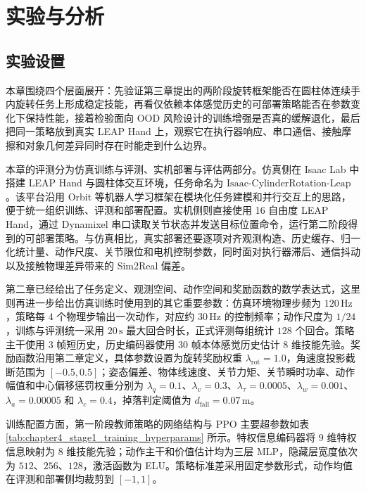 \section{实验与分析}

\subsection{实验设置}
\label{sec:chapter4_exp_setting}
\thesisbodyfont
本章围绕四个层面展开：先验证第三章提出的两阶段旋转框架能否在圆柱体连续手内旋转任务上形成稳定技能，再看仅依赖本体感觉历史的可部署策略能否在参数变化下保持性能，接着检验面向 OOD 风险设计的训练增强是否真的缓解退化，最后把同一策略放到真实 LEAP Hand 上，观察它在执行器响应、串口通信、接触摩擦和对象几何差异同时存在时能走到什么边界。

本章的评测分为仿真训练与评测、实机部署与评估两部分。仿真侧在 Isaac Lab 中搭建 LEAP Hand 与圆柱体交互环境，任务命名为 \(\mathrm{Isaac\text{-}CylinderRotation\text{-}Leap}\)。该平台沿用 Orbit 等机器人学习框架在模块化任务建模和并行交互上的思路，便于统一组织训练、评测和部署配置\cite{orbit2023}。实机侧则直接使用 16 自由度 LEAP Hand，通过 Dynamixel 串口读取关节状态并发送目标位置命令，运行第二阶段得到的可部署策略。与仿真相比，真实部署还要逐项对齐观测构造、历史缓存、归一化统计量、动作尺度、关节限位和电机控制参数，同时面对执行器滞后、通信抖动以及接触物理差异带来的 Sim2Real 偏差。

第二章已经给出了任务定义、观测空间、动作空间和奖励函数的数学表达式，这里则再进一步给出仿真训练时使用到的其它重要参数：仿真环境物理步频为 \(120\,\mathrm{Hz}\)，策略每 \(4\) 个物理步输出一次动作，对应约 \(30\,\mathrm{Hz}\) 的控制频率；动作尺度为 \(1/24\)，训练与评测统一采用 \(20\,\mathrm{s}\) 最大回合时长，正式评测每组统计 \(128\) 个回合。策略主干使用 \(3\) 帧短历史，历史编码器使用 \(30\) 帧本体感觉历史估计 \(8\) 维技能先验。奖励函数沿用第二章定义，具体参数设置为旋转奖励权重 \(\lambda_{\mathrm{rot}}=1.0\)，角速度投影截断范围为 \([-0.5,0.5]\)；姿态偏差、物体线速度、关节力矩、关节瞬时功率、动作幅值和中心偏移惩罚权重分别为 \(\lambda_q=0.1\)、\(\lambda_v=0.3\)、\(\lambda_{\tau}=0.0005\)、\(\lambda_w=0.001\)、\(\lambda_a=0.00005\) 和 \(\lambda_c=0.4\)，掉落判定阈值为 \(d_{\mathrm{fall}}=0.07\,\mathrm{m}\)。

训练配置方面，第一阶段教师策略的网络结构与 PPO 主要超参数如表 \ref{tab:chapter4_stage1_training_hyperparams} 所示。特权信息编码器将 \(9\) 维特权信息映射为 \(8\) 维技能先验；动作主干和价值估计均为三层 MLP，隐藏层宽度依次为 \(512\)、\(256\)、\(128\)，激活函数为 ELU。策略标准差采用固定参数形式，动作均值在评测和部署侧均裁剪到 \([-1,1]\)。


